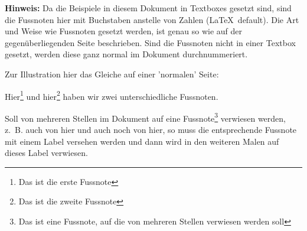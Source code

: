 
\textbf{Hinweis:} Da die Beispiele in diesem Dokument in Textboxes gesetzt sind, sind die Fussnoten hier mit Buchstaben anstelle von Zahlen (\LaTeX\ default). Die Art und Weise wie Fussnoten gesetzt werden, ist genau so wie auf der gegenüberliegenden Seite beschrieben. Sind die Fussnoten nicht in einer Textbox gesetzt, werden diese ganz normal im Dokument durchnummeriert.

\bigskip 
Zur Illustration hier das Gleiche auf einer 'normalen' Seite: 

Hier\footnote{Das ist die erste Fussnote} und hier\footnote{Das ist die zweite Fussnote} haben wir zwei unterschiedliche Fussnoten.

Soll von mehreren Stellen im Dokument auf eine Fussnote\footnote{Das ist eine Fussnote, auf die von mehreren Stellen verwiesen werden soll\label{ftn:multi}} verwiesen werden, z.~B. auch von hier und auch noch von hier, so muss die entsprechende Fussnote mit einem Label versehen werden und dann wird in den weiteren Malen auf dieses Label verwiesen.
